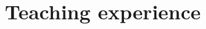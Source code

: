 \documentclass[letterpaper]{article}
\begin{document}





\section*{Teaching experience}
\end{document}
